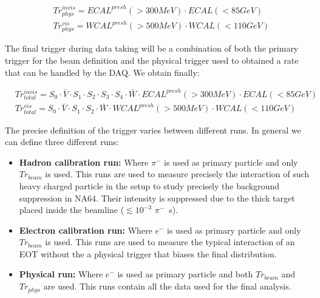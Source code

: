 \begin{equation}
  \label{eq:trigger-phys}
  \begin{split}
    & Tr^{invis}_{phys} = ECAL^{presh}(>300 MeV) \cdot ECAL(<85 GeV)\\
    & Tr^{vis}_{phys} = WCAL^{presh}(>500 MeV) \cdot WCAL(<110 GeV)
  \end{split}
\end{equation}

The final trigger during data taking will be a combination of both the primary trigger for the beam definition and the physical trigger used to obtained a rate that can be handled by the DAQ. We obtain finally:

\begin{equation}
  \label{eq:trigger-total}
  \begin{split}
  & Tr^{invis}_{total} = S_0 \cdot \bar{V} \cdot S_1 \cdot S_2 \cdot S_3 \cdot S_4 \cdot \bar{W} \cdot ECAL^{presh}(>300 MeV) \cdot ECAL(<85 GeV)\\
  & Tr^{vis}_{total} = S_0 \cdot \bar{V} \cdot S_1 \cdot S_2\cdot \bar{W} \cdot WCAL^{presh}(>500 MeV) \cdot WCAL(<110 GeV)
  \end{split}
\end{equation}

The precise definition of the trigger varies between different runs. In general we can define three different runs:

\begin{itemize}
\item \textbf{Hadron calibration run:} Where $\pi^-$ is used as primary particle and only $Tr_{beam}$ is used. This runs are used to measure precisely the interaction of such heavy charged particle in the setup to study precisely the background suppression in NA64. Their intensity is suppressed due to the thick target placed inside the beamline ($\lesssim 10^{-3}$ $\pi^-$\si{\per\second}).
\item \textbf{Electron calibration run:} Where $e^-$ is used as primary particle and only $Tr_{beam}$ is used. This runs are used to measure the typical interaction of an EOT without the a physical trigger that biases the final distribution. 
\item \textbf{Physical run:} Where $e^-$ is used as primary particle and both $Tr_{beam}$ and $Tr_{phys}$ are used. This runs contain all the data used for the final analysis. 
\end{itemize}

